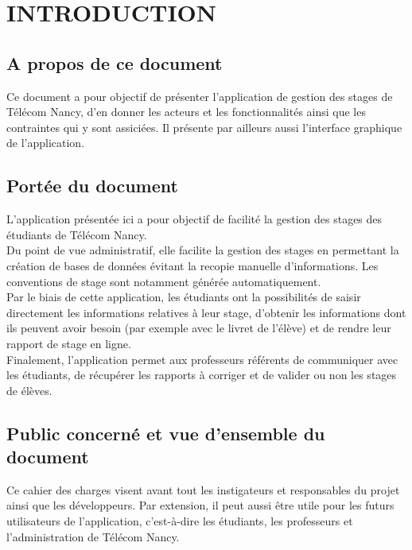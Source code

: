 \documentclass{scrreprt}
\begin{document}
\chapter{INTRODUCTION}

\section{A propos de ce document}
\hspace{1cm}Ce document a pour objectif de présenter l'application de gestion des stages de Télécom Nancy, d'en donner les acteurs et les fonctionnalités ainsi que les contraintes qui y sont assiciées. Il présente par ailleurs aussi l'interface graphique de l'application.

\section{Portée du document}
\hspace{1cm}L'application présentée ici a pour objectif de facilité la gestion des stages des étudiants de Télécom Nancy.\\

\hspace{0.7cm}Du point de vue administratif, elle facilite la gestion des stages en permettant la création de bases de données évitant la recopie manuelle d'informations. Les conventions de stage sont notamment générée automatiquement.\\

\hspace{0.7cm}Par le biais de cette application, les étudiants ont la possibilités de saisir directement les informations relatives à leur stage, d'obtenir les informations dont ils peuvent avoir besoin (par exemple avec le livret de l'élève) et de rendre leur rapport de stage en ligne.\\

\hspace{0.7cm}Finalement, l'application permet aux professeurs référents de communiquer avec les étudiants, de récupérer les rapports à corriger et de valider ou non les stages de élèves.

\section{Public concerné et vue d'ensemble du document }

\hspace{1cm}Ce cahier des charges visent avant tout les instigateurs et responsables du projet ainsi que les développeurs. Par extension, il peut aussi être utile pour les futurs utilisateurs de l'application, c'est-à-dire les étudiants, les professeurs et l'administration de Télécom Nancy.\\
\end{document}
